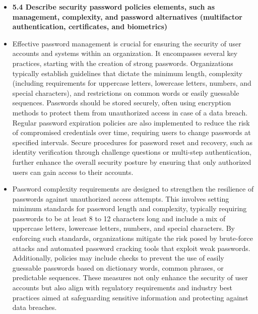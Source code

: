 \documentclass{article}
\begin{document}
\begin{itemize}
  \item \textbf{5.4 Describe security password policies elements, such as management, complexity, and password alternatives (multifactor authentication, certificates, and biometrics)}
  	\item[] Effective password management is crucial for ensuring the security of user accounts and systems within an organization. It encompasses several key practices, starting with the creation of strong passwords. Organizations typically establish guidelines that dictate the minimum length, complexity (including requirements for uppercase letters, lowercase letters, numbers, and special characters), and restrictions on common words or easily guessable sequences. Passwords should be stored securely, often using encryption methods to protect them from unauthorized access in case of a data breach. Regular password expiration policies are also implemented to reduce the risk of compromised credentials over time, requiring users to change passwords at specified intervals. Secure procedures for password reset and recovery, such as identity verification through challenge questions or multi-step authentication, further enhance the overall security posture by ensuring that only authorized users can gain access to their accounts.
	\item[] Password complexity requirements are designed to strengthen the resilience of passwords against unauthorized access attempts. This involves setting minimum standards for password length and complexity, typically requiring passwords to be at least 8 to 12 characters long and include a mix of uppercase letters, lowercase letters, numbers, and special characters. By enforcing such standards, organizations mitigate the risk posed by brute-force attacks and automated password cracking tools that exploit weak passwords. Additionally, policies may include checks to prevent the use of easily guessable passwords based on dictionary words, common phrases, or predictable sequences. These measures not only enhance the security of user accounts but also align with regulatory requirements and industry best practices aimed at safeguarding sensitive information and protecting against data breaches.

\end{itemize}
\end{document}
